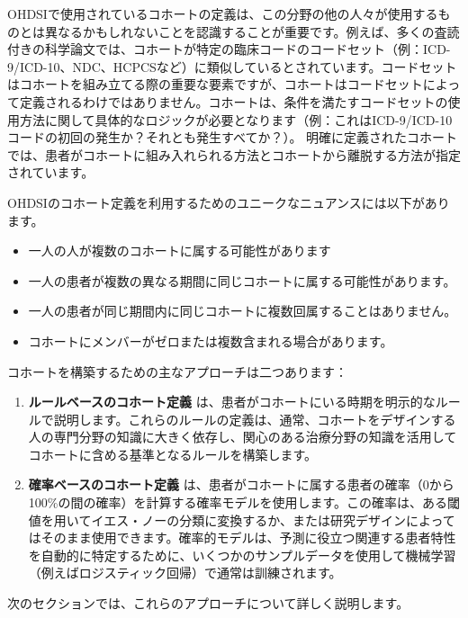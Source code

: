 \documentclass[
  11pt]{book}
\providecommand{\tightlist}{%
  \setlength{\itemsep}{0pt}\setlength{\parskip}{0pt}}
\theoremstyle{definition}
\theoremstyle{definition}
\theoremstyle{definition}
\theoremstyle{definition}
\theoremstyle{remark}
\begin{document}
  OHDSIで使用されているコホートの定義は、この分野の他の人々が使用するものとは異なるかもしれないことを認識することが重要です。例えば、多くの査読付きの科学論文では、コホートが特定の臨床コードのコードセット（例：ICD-9/ICD-10、NDC、HCPCSなど）に類似しているとされています。コードセットはコホートを組み立てる際の重要な要素ですが、コホートはコードセットによって定義されるわけではありません。コホートは、条件を満たすコードセットの使用方法に関して具体的なロジックが必要となります（例：これはICD-9/ICD-10コードの初回の発生か？それとも発生すべてか？）。 明確に定義されたコホートでは、患者がコホートに組み入れられる方法とコホートから離脱する方法が指定されています。 

 OHDSIのコホート定義を利用するためのユニークなニュアンスには以下があります。

\begin{itemize}
\tightlist
\item
  一人の人が複数のコホートに属する可能性があります
\item
  一人の患者が複数の異なる期間に同じコホートに属する可能性があります。
\item
  一人の患者が同じ期間内に同じコホートに複数回属することはありません。
\item
  コホートにメンバーがゼロまたは複数含まれる場合があります。
\end{itemize}

コホートを構築するための主なアプローチは二つあります：

\begin{enumerate}
\def\labelenumi{\arabic{enumi}.}
\item
  \textbf{ルールベースのコホート定義} は、患者がコホートにいる時期を明示的なルールで説明します。これらのルールの定義は、通常、コホートをデザインする人の専門分野の知識に大きく依存し、関心のある治療分野の知識を活用してコホートに含める基準となるルールを構築します。
\item
  \textbf{確率ベースのコホート定義} は、患者がコホートに属する患者の確率（0から100\%の間の確率）を計算する確率モデルを使用します。この確率は、ある閾値を用いてイエス・ノーの分類に変換するか、または研究デザインによってはそのまま使用できます。確率的モデルは、予測に役立つ関連する患者特性を自動的に特定するために、いくつかのサンプルデータを使用して機械学習（例えばロジスティック回帰）で通常は訓練されます。
\end{enumerate}

次のセクションでは、これらのアプローチについて詳しく説明します。
\end{document}
